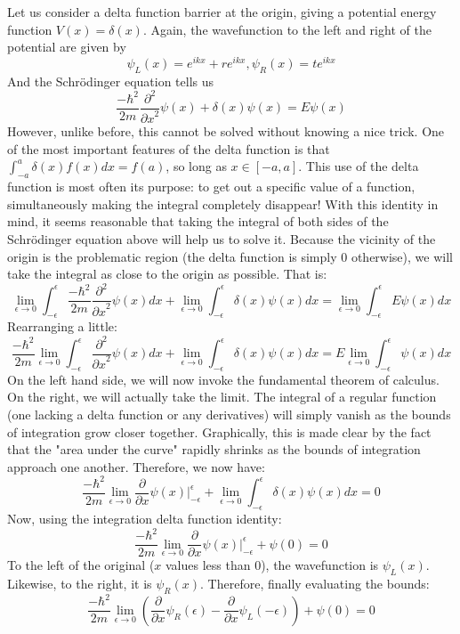 \documentclass{report}
\begin{document}
Let us consider a delta function barrier at the origin, giving a potential energy function $V(x) = \delta(x)$. Again, the wavefunction to the left and right of the potential are given by 
\[
\psi_L(x) = e^{ikx} + re^{ikx}, \psi_R(x) = te^{ikx}
\]
And the Schrödinger equation tells us
\[
\frac{-\hbar^2}{2m} \frac{\partial^2}{{\partial x}^2} \psi(x) + \delta(x) \psi(x) = E\psi(x)
\]
However, unlike before, this cannot be solved without knowing a nice trick. One of the most important features of the delta function is that $\int_{-a}^{a}\delta(x)f(x)dx = f(a)$, so long as $x \in [-a, a]$. This use of the delta function is most often its purpose: to get out a specific value of a function, simultaneously making the integral completely disappear! With this identity in mind, it seems reasonable that taking the integral of both sides of the Schrödinger equation above will help us to solve it. Because the vicinity of the origin is the problematic region (the delta function is simply 0 otherwise), we will take the integral as close to the origin as possible. That is:
\[
\lim_{\epsilon \to 0} \int_{-\epsilon}^{\epsilon} \frac{-\hbar^2}{2m} \frac{\partial^2}{{\partial x}^2} \psi(x) dx + \lim_{\epsilon \to 0} \int_{-\epsilon}^{\epsilon} \delta(x) \psi(x) dx = \lim_{\epsilon \to 0} \int_{-\epsilon}^{\epsilon} E\psi(x) dx
\]
Rearranging a little:
\[
\frac{-\hbar^2}{2m} \lim_{\epsilon \to 0} \int_{-\epsilon}^{\epsilon} \frac{\partial^2}{{\partial x}^2} \psi(x) dx + \lim_{\epsilon \to 0} \int_{-\epsilon}^{\epsilon} \delta(x) \psi(x) dx = E \lim_{\epsilon \to 0} \int_{-\epsilon}^{\epsilon} \psi(x) dx
\]
On the left hand side, we will now invoke the fundamental theorem of calculus. On the right, we will actually take the limit. The integral of a regular function (one lacking a delta function or any derivatives) will simply vanish as the bounds of integration grow closer together. Graphically, this is made clear by the fact that the "area under the curve" rapidly shrinks as the bounds of integration approach one another. Therefore, we now have:
\[
\frac{-\hbar^2}{2m} \lim_{\epsilon \to 0} \frac{\partial}{\partial x} \psi(x) |_{-\epsilon}^{\epsilon} + \lim_{\epsilon \to 0} \int_{-\epsilon}^{\epsilon} \delta(x) \psi(x) dx = 0
\]
Now, using the integration delta function identity:
\[
\frac{-\hbar^2}{2m} \lim_{\epsilon \to 0} \frac{\partial}{\partial x} \psi(x) |_{-\epsilon}^{\epsilon} + \psi(0) = 0
\]
To the left of the original ($x$ values less than 0), the wavefunction is $\psi_L(x)$. Likewise, to the right, it is $\psi_R(x)$. Therefore, finally evaluating the bounds:
\[
\frac{-\hbar^2}{2m} \lim_{\epsilon \to 0} (\frac{\partial}{\partial x} \psi_R(\epsilon) - \frac{\partial}{\partial x} \psi_L(-\epsilon)) + \psi(0) = 0
\]
\end{document}
